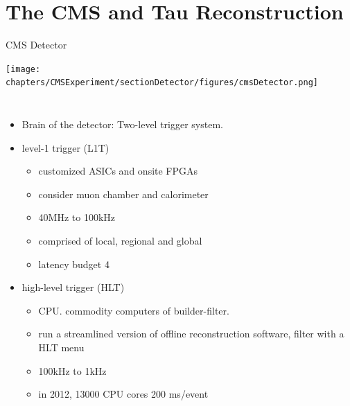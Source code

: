 \section{The CMS and Tau Reconstruction}
\begin{frame}{CMS Detector}
    \begin{center}
        \texttt{[image: chapters/CMSExperiment/sectionDetector/figures/cmsDetector.png]}
    \end{center}
\end{frame}



%

\begin{frame}{}
\smaller
    \begin{columns}

    \begin{itemize} 
        \item Brain of the detector: Two-level trigger system.
        \item level-1 trigger (L1T)
        \begin{itemize} 
            \item customized ASICs and onsite FPGAs
            \item consider muon chamber and calorimeter
            \item 40MHz to 100kHz
            \item comprised of local, regional and global 
            \item latency budget 4\mus 
        \end{itemize}
        
        \item high-level trigger (HLT)
        \begin{itemize} 
            \item CPU. commodity computers of builder-filter.
            \item run a streamlined version of offline reconstruction software, filter with a HLT menu
            \item 100\;kHz to 1\;kHz
            \item in 2012, 13000 CPU cores 200 ms/event \cite{Trocino:2014jya}
        \end{itemize}
    \end{itemize}
    

\end{columns}
\end{frame}
